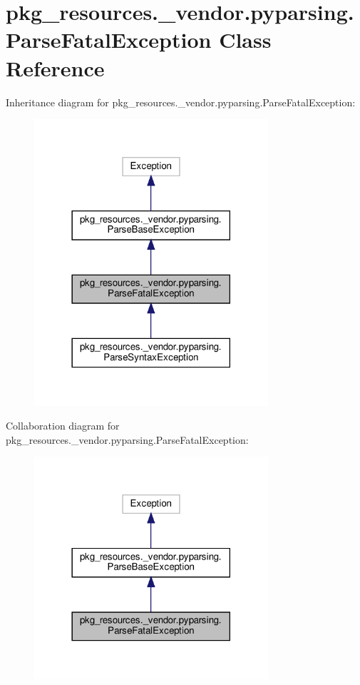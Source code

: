 \hypertarget{classpkg__resources_1_1__vendor_1_1pyparsing_1_1ParseFatalException}{}\section{pkg\+\_\+resources.\+\_\+vendor.\+pyparsing.\+Parse\+Fatal\+Exception Class Reference}
\label{classpkg__resources_1_1__vendor_1_1pyparsing_1_1ParseFatalException}


Inheritance diagram for pkg\+\_\+resources.\+\_\+vendor.\+pyparsing.\+Parse\+Fatal\+Exception\+:
\nopagebreak
\begin{figure}[H]
\begin{center}
\leavevmode
\includegraphics[width=246pt]{classpkg__resources_1_1__vendor_1_1pyparsing_1_1ParseFatalException__inherit__graph}
\end{center}
\end{figure}


Collaboration diagram for pkg\+\_\+resources.\+\_\+vendor.\+pyparsing.\+Parse\+Fatal\+Exception\+:
\nopagebreak
\begin{figure}[H]
\begin{center}
\leavevmode
\includegraphics[width=246pt]{classpkg__resources_1_1__vendor_1_1pyparsing_1_1ParseFatalException__coll__graph}
\end{center}
\end{figure}
